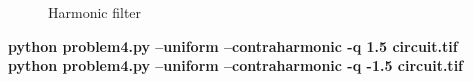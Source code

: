 \begin{figure}[!htb]\centering
    \begin{minipage}{0.45\textwidth}
        \caption{\small{Harmonic filter}}\label{diagram:uniform_harmonic}
    \end{minipage}
\end{figure}

\pagebreak
\begin{minipage}{\textwidth}
\textbf{python problem4.py --uniform --contraharmonic -q 1.5 circuit.tif} \\
\textbf{python problem4.py --uniform --contraharmonic -q -1.5 circuit.tif} \\
\end{minipage}

